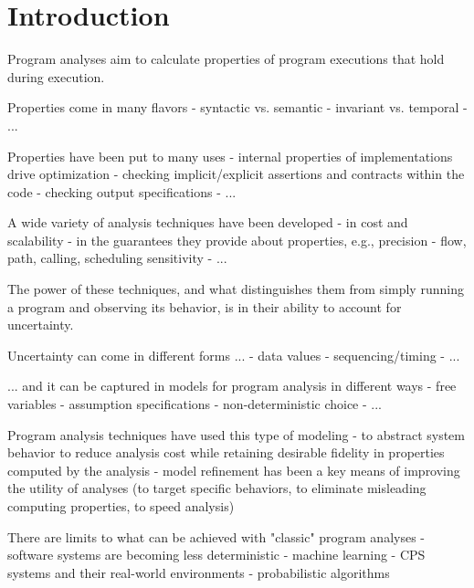 \section{Introduction}
\label{sec:introduction}

Program analyses aim to calculate properties of program executions 
that hold during execution.

Properties come in many flavors 
 - syntactic vs. semantic 
 - invariant vs. temporal
 - ...  

Properties have been put to many uses 
 - internal properties of implementations drive optimization 
 - checking implicit/explicit assertions and contracts within the code
 - checking output specifications
 - ...

A wide variety of analysis techniques have been developed
 - in cost and scalability
 - in the guarantees they provide about properties, e.g., precision
 - flow, path, calling, scheduling sensitivity
 - ...

The power of these techniques, and what distinguishes them from
simply running a program and observing its behavior, is in their
ability to account for uncertainty.
 
Uncertainty can come in different forms ...
 - data values
 - sequencing/timing
 - ...

... and it can be captured in models for program analysis in different ways
 - free variables
 - assumption specifications
 - non-deterministic choice
 - ...

Program analysis techniques have used this type of modeling
 - to abstract system behavior to reduce analysis cost while
   retaining desirable fidelity in properties computed by the
   analysis 
 - model refinement has been a key means of improving the utility 
   of analyses (to target specific behaviors, to eliminate misleading
   computing properties, to speed analysis)

There are limits to what can be achieved with "classic" program analyses
 - software systems are becoming less deterministic
   - machine learning
   - CPS systems and their real-world environments
   - probabilistic algorithms




